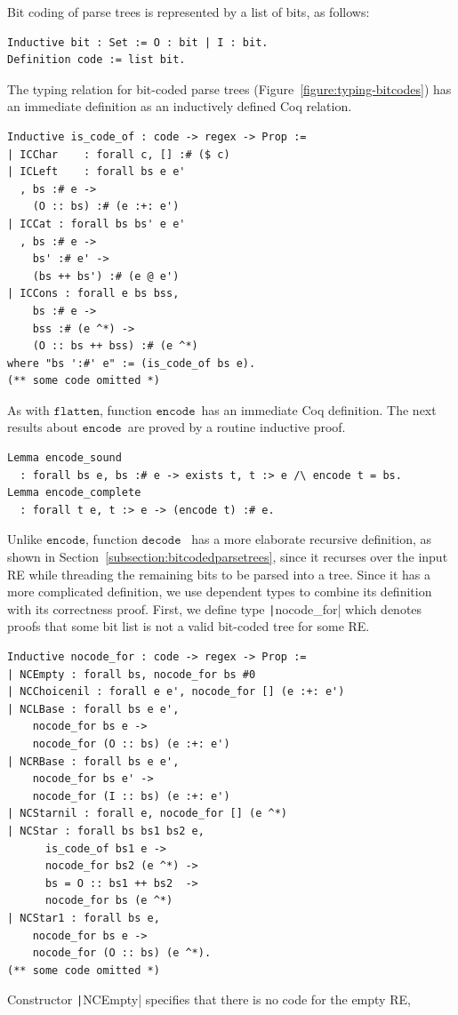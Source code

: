 \documentclass[review]{elsarticle}
\newcommand{\flatten}{\ensuremath{\texttt{flatten}}}
\newcommand{\code}{\ensuremath{\texttt{encode}}}
\newcommand{\decodee}{\ensuremath{\texttt{decode}}}
\newcommand{\coq}[1]{\texttt|#1|}
\theoremstyle{definition}
\begin{document}
Bit coding of parse trees is represented by a list of bits, as follows:
\begin{verbatim}
Inductive bit : Set := O : bit | I : bit.
Definition code := list bit.
\end{verbatim}
The typing relation for bit-coded parse trees
(Figure~\ref{figure:typing-bitcodes}) has an immediate definition as an
inductively defined Coq relation.
\begin{verbatim}
Inductive is_code_of : code -> regex -> Prop :=
| ICChar    : forall c, [] :# ($ c)
| ICLeft    : forall bs e e'
  , bs :# e ->
    (O :: bs) :# (e :+: e')
| ICCat : forall bs bs' e e'
  , bs :# e ->
    bs' :# e' ->
    (bs ++ bs') :# (e @ e')
| ICCons : forall e bs bss, 
    bs :# e -> 
    bss :# (e ^*) -> 
    (O :: bs ++ bss) :# (e ^*) 
where "bs ':#' e" := (is_code_of bs e).
(** some code omitted *)
\end{verbatim}
As with \flatten, function \code~has an immediate Coq definition. The next
results about \code~are proved by a routine inductive proof.
\begin{verbatim}
Lemma encode_sound
  : forall bs e, bs :# e -> exists t, t :> e /\ encode t = bs.
Lemma encode_complete
  : forall t e, t :> e -> (encode t) :# e.   
\end{verbatim}
Unlike \code, function \decodee~ has a more elaborate recursive definition, as
shown in Section~\ref{subsection:bitcodedparsetrees}, since it recurses over the
input RE while threading the remaining bits to be parsed into a tree. Since it
has a more complicated definition, we use dependent types to combine its definition
with its correctness proof. First, we define type \coq{nocode_for} which
denotes proofs that some bit list is not a valid bit-coded tree for some RE.
\begin{verbatim}
Inductive nocode_for : code -> regex -> Prop :=
| NCEmpty : forall bs, nocode_for bs #0
| NCChoicenil : forall e e', nocode_for [] (e :+: e')
| NCLBase : forall bs e e', 
    nocode_for bs e -> 
    nocode_for (O :: bs) (e :+: e')
| NCRBase : forall bs e e', 
    nocode_for bs e' -> 
    nocode_for (I :: bs) (e :+: e')
| NCStarnil : forall e, nocode_for [] (e ^*)
| NCStar : forall bs bs1 bs2 e,
      is_code_of bs1 e ->
      nocode_for bs2 (e ^*) ->
      bs = O :: bs1 ++ bs2  ->
      nocode_for bs (e ^*)
| NCStar1 : forall bs e,
    nocode_for bs e ->
    nocode_for (O :: bs) (e ^*).
(** some code omitted *)
\end{verbatim}
Constructor \coq{NCEmpty} specifies that there is no code for the empty RE,
\end{document}
